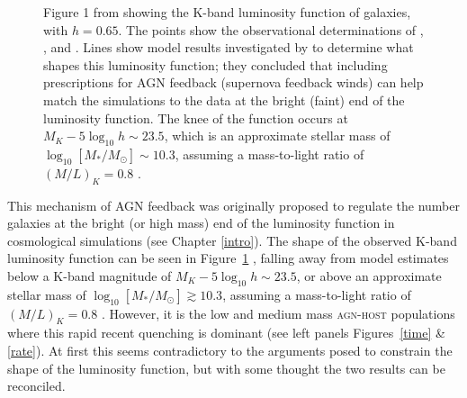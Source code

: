  \begin{figure}
\caption[Galaxy luminosity function from observations and simulations: Figure 1 of \cite{benson03}]{Figure 1 from \cite{benson03} showing the K-band luminosity function of galaxies, with $h=0.65$. The points show the observational determinations of \cite[][circles]{cole01}, \cite[][squares]{kochanek01}, and \cite[][$z < 0.1$, stars]{huang03}. Lines show model results investigated by \cite{benson03} to determine what shapes this luminosity function; they concluded that including prescriptions for AGN feedback (supernova feedback winds) can help match the simulations to the data at the bright (faint) end of the luminosity function. The knee of the function occurs at $M_K -5\log_{10} h \sim 23.5$, which is an approximate stellar mass of $\log_{10}[M_*/M_{\odot}] \sim 10.3$, assuming a mass-to-light ratio of $(M/L)_K = 0.8$ \citep{brinchmann00}.}
\label{lumfunc}
\end{figure}

This mechanism of AGN feedback was originally proposed to regulate the number galaxies at the bright (or high mass) end of the luminosity function in cosmological simulations (see Chapter \ref{intro}). The shape of the observed K-band luminosity function can be seen in Figure~\ref{lumfunc} \citep[Figure 1 from][]{benson03}, falling away from model estimates below a K-band magnitude of $M_K -5\log_{10} h \sim 23.5$, or above an approximate stellar mass of $\log_{10}[M_*/M_{\odot}] \gtrsim 10.3$, assuming a mass-to-light ratio of $(M/L)_K = 0.8$ \citep{brinchmann00}. However, it is the low and medium mass \textsc{agn-host} populations where this rapid recent quenching is dominant (see left panels Figures~\ref{time} \& \ref{rate}). At first this seems contradictory to the arguments posed to constrain the shape of the luminosity function, but with some thought the two results can be reconciled. 


